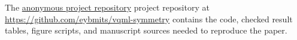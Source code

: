 The
\ifanonymouspaper
\href{https://anonymous.4open.science/r/qc_symmetry-5FB4/}{anonymous project repository}
\else
project repository at \url{https://github.com/eybmits/vqml-symmetry}
\fi
contains the code, checked result tables, figure scripts, and manuscript
sources needed to reproduce the paper.
